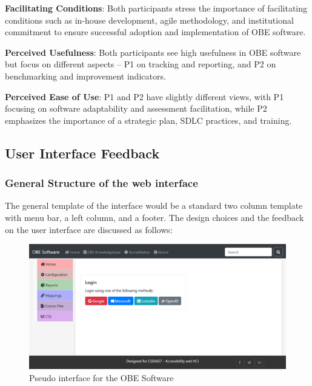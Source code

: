 \documentclass[journal,onecolumn]{IEEEtran}
\begin{document}
\textbf{Facilitating Conditions}: Both participants stress the importance of facilitating conditions such as in-house development, agile methodology, and institutional commitment to ensure successful adoption and implementation of OBE software.

\textbf{Perceived Usefulness}: Both participants see high usefulness in OBE software but focus on different aspects – P1 on tracking and reporting, and P2 on benchmarking and improvement indicators.

\textbf{Perceived Ease of Use}: P1 and P2 have slightly different views, with P1 focusing on software adaptability and assessment facilitation, while P2 emphasizes the importance of a strategic plan, SDLC practices, and training.











\subsection{\textbf{User Interface Feedback}}


\subsubsection{General Structure of the web interface}

The general template of the interface would be a standard two column template with menu bar, a left column, and a footer. The design choices and the feedback on the user interface are discussed as follows: 

\begin{figure}[b]
    \centering
    \includegraphics[width=0.8\linewidth]{img/Picture4.png}
    \caption{Pseudo interface for the OBE Software}
    \label{fig:pseudo-interface}
\end{figure}
\end{document}
